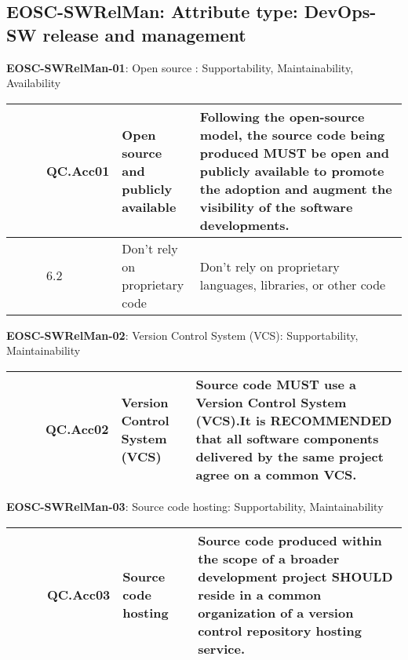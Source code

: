 \subsection{EOSC-SWRelMan: Attribute type: DevOps-SW release and management}

\textbf{EOSC-SWRelMan-01}: Open source : Supportability, Maintainability, Availability
\nopagebreak[4]
\begin{center}
    \tabletail{\hline}
    \tiny
    \begin{supertabular}{|p{0.10\linewidth}|p{0.10\linewidth}|p{0.20\linewidth}|p{0.60\linewidth}|} \hline
        \cite{orviz_set_2017} & QC.Acc01 & Open source and publicly available & Following the open-source model, the source code being produced MUST be open and publicly available to promote the adoption and augment the visibility of the software developments.\\ \hline
        \cite{raymond_software_2013} & 6.2 & Don't rely on proprietary code & Don't rely on proprietary languages, libraries, or other code\\ \hline
    \end{supertabular}
\end{center}

\textbf{EOSC-SWRelMan-02}: Version Control System (VCS): Supportability, Maintainability
\nopagebreak[4]
\begin{center}
    \tabletail{\hline}
    \tiny
    \begin{supertabular}{|p{0.10\linewidth}|p{0.10\linewidth}|p{0.20\linewidth}|p{0.60\linewidth}|} \hline
        \cite{orviz_set_2017} & QC.Acc02 & Version Control System (VCS) & Source code MUST use a Version Control System (VCS).It is RECOMMENDED that all software components delivered by the same project agree on a common VCS.\\ \hline
    \end{supertabular}
\end{center}

\textbf{EOSC-SWRelMan-03}: Source code hosting: Supportability, Maintainability
\nopagebreak[4]
\begin{center}
    \tabletail{\hline}
    \tiny
    \begin{supertabular}{|p{0.10\linewidth}|p{0.10\linewidth}|p{0.20\linewidth}|p{0.60\linewidth}|} \hline
        \cite{orviz_set_2017} & QC.Acc03 & Source code hosting & Source code produced within the scope of a broader development project SHOULD reside in a common organization of a version control repository hosting service.\\ \hline
    \end{supertabular}
\end{center}

